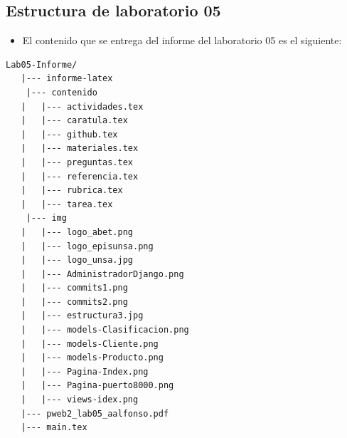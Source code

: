 \subsection{Estructura de laboratorio 05}
\begin{itemize}	
	\item El contenido que se entrega del informe del laboratorio 05 es el siguiente:
\end{itemize}

\begin{lstlisting}[style=ascii-tree]
	Lab05-Informe/
   |--- informe-latex
	|--- contenido
   |   |--- actividades.tex
   |   |--- caratula.tex
   |   |--- github.tex
   |   |--- materiales.tex
   |   |--- preguntas.tex
   |   |--- referencia.tex
   |   |--- rubrica.tex
   |   |--- tarea.tex
	|--- img
   |   |--- logo_abet.png
   |   |--- logo_episunsa.png
   |   |--- logo_unsa.jpg
   |   |--- AdministradorDjango.png
   |   |--- commits1.png
   |   |--- commits2.png
   |   |--- estructura3.jpg
   |   |--- models-Clasificacion.png
   |   |--- models-Cliente.png
   |   |--- models-Producto.png
   |   |--- Pagina-Index.png
   |   |--- Pagina-puerto8000.png
   |   |--- views-idex.png
   |--- pweb2_lab05_aalfonso.pdf    
   |--- main.tex
\end{lstlisting}    